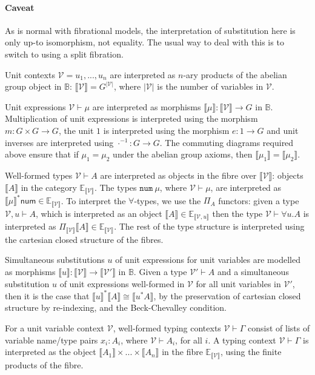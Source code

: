 \documentclass{article}
\newcommand{\cat}[1]{\mathbb{#1}}
\newcommand{\sem}[1]{\llbracket #1 \rrbracket}
\begin{document}
\paragraph{Caveat} As is normal with fibrational models, the
interpretation of substitution here is only up-to isomorphism, not
equality. The usual way to deal with this is to switch to using a
split fibration.

\medskip

Unit contexts $\mathcal{V} = u_1,...,u_n$ are interpreted as $n$-ary
products of the abelian group object in $\cat{B}$: $\sem{\mathcal{V}}
= G^{|\mathcal{V}|}$, where $|\mathcal{V}|$ is the number of variables
in $\mathcal{V}$.

Unit expressions $\mathcal{V} \vdash \mu$ are interpreted as morphisms
$\sem{\mu} : \sem{\mathcal{V}} \to G$ in $\cat{B}$. Multiplication of
unit expressions is interpreted using the morphism $m : G \times G \to
G$, the unit $1$ is interpreted using the morphism $e : 1 \to G$ and
unit inverses are interpreted using $\cdot^{-1} : G \to G$. The
commuting diagrams required above ensure that if $\mu_1 = \mu_2$ under
the abelian group axioms, then $\sem{\mu_1} = \sem{\mu_2}$.

Well-formed types $\mathcal{V} \vdash A$ are interpreted as objects in
the fibre over $\sem{\mathcal{V}}$: objects $\sem{A}$ in the category
$\cat{E}_{\sem{\mathcal{V}}}$. The types $\texttt{num}\ \mu$, where
$\mathcal{V} \vdash \mu$, are interpreted as $\sem{\mu}^*\mathsf{num}
\in \cat{E}_{\sem{\mathcal{V}}}$. To interpret the $\forall$-types, we
use the $\Pi_A$ functors: given a type $\mathcal{V}, u \vdash A$,
which is interpreted as an object $\sem{A} \in
\cat{E}_{\sem{\mathcal{V},u}}$ then the type $\mathcal{V} \vdash
\forall u. A$ is interpreted as $\Pi_{\sem{\mathcal{V}}}\sem{A} \in
\cat{E}_{\sem{\mathcal{V}}}$. The rest of the type structure is
interpreted using the cartesian closed structure of the fibres.

Simultaneous substitutions $u$ of unit expressions for unit variables
are modelled as morphisms $\sem{u} : \sem{\mathcal{V}} \to
\sem{\mathcal{V'}}$ in $\cat{B}$. Given a type $\mathcal{V'} \vdash A$
and a simultaneous substitution $u$ of unit expressions well-formed in
$\mathcal{V}$ for all unit variables in $\mathcal{V'}$, then it is the
case that $\sem{u}^*\sem{A} \cong \sem{u^*A}$, by the preservation of
cartesian closed structure by re-indexing, and the Beck-Chevalley
condition.

For a unit variable context $\mathcal{V}$, well-formed typing contexts
$\mathcal{V} \vdash \Gamma$ consist of lists of variable name/type
pairs $x_i : A_i$, where $\mathcal{V} \vdash A_i$, for all $i$. A
typing context $\mathcal{V} \vdash \Gamma$ is interpreted as the
object $\sem{A_1} \times ... \times \sem{A_n}$ in the fibre
$\cat{E}_{\sem{\mathcal{V}}}$, using the finite products of the fibre.
\end{document}
